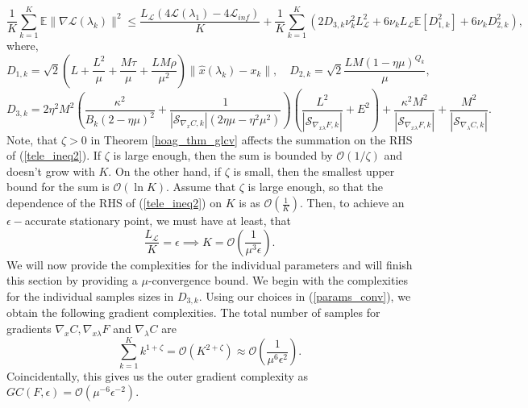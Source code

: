 \documentclass[11pt, twoside]{report}
\begin{document}
\begin{equation} \label{tele_ineq2}
    \frac{1}{K}\sum_{k=1}^K \mathbb{E}\|\nabla\mathcal{L}(\lambda_k)\|^2 \leq  \frac{L_\mathcal{L}\left(4\mathcal{L}(\lambda_1) - 4\mathcal{L}_{inf}\right)}{K} + \frac{1}{K}\sum_{k=1}^K \left(2D_{3,k}\nu_k^2 L^2_{\mathcal{L}} + 6\nu_kL_\mathcal{L}\mathbb{E}[D_{1,k}^2] + 6\nu_k D_{2,k}^2\right),
\end{equation}
where,
\[D_{1,k} = \sqrt{2}\left(L + \frac{L^2}{\mu} + \frac{M\tau}{\mu} + \frac{LM\rho}{\mu^2} \right) \|\hat{x}(\lambda_k) - x_k\|, \quad D_{2,k} = \sqrt{2} \frac{LM(1-\eta \mu)^{Q_k}}{\mu},\]
\begin{equation} \label{varbndthm2}
    D_{3,k} = 2\eta^2M^2\left(\frac{\kappa^2}{B_k (2 - \eta \mu)^2} + \frac{1}{|\mathcal{S}_{\nabla_{x} C,k}|(2\eta \mu - \eta^2 \mu^2)} \right)\left(\frac{L^2}{|\mathcal{S}_{\nabla_{x\lambda} F,k}|} + E^2\right)  +  \frac{\kappa^2M^2}{|\mathcal{S}_{\nabla_{x\lambda} F,k}|}+ \frac{M^2}{|\mathcal{S}_{\nabla_{\lambda} C,k}|}.
\end{equation}
Note, that $\zeta>0$ in Theorem \ref{hoag_thm_glcv} affects the summation on the RHS of (\ref{tele_ineq2}). If $\zeta$ is large enough, then the sum is bounded by $\mathcal{O}(1/\zeta)$ and doesn't grow with $K$. On the other hand, if $\zeta$ is small, then the smallest upper bound for the sum is $\mathcal{O}(\ln{K})$. Assume that $\zeta$ is large enough, so that the dependence of the RHS of (\ref{tele_ineq2}) on $K$ is as $\mathcal{O}\left( \frac{1}{K} \right)$. Then, to achieve an $\epsilon-$accurate stationary point, we must have at least, that
\[\frac{L_\mathcal{L}}{K} = \epsilon \implies K = \mathcal{O}\left(\frac{1}{\mu^3 \epsilon} \right).\]
We will now provide the complexities for the individual parameters and will finish this section by providing a $\mu$-convergence bound. We begin with the complexities for the individual samples sizes in $D_{3,k}$. Using our choices in (\ref{params_conv}), we obtain the following gradient complexities. The total number of samples for gradients $\nabla_{x}C, \nabla_{x\lambda} F$ and $\nabla_\lambda C$ are
\[\sum_{k=1}^K k^{1+\zeta} = \mathcal{O} \left(K^{2+\zeta} \right) \approx \mathcal{O}\left(\frac{1}{\mu^6\epsilon^2}\right).\]
Coincidentally, this gives us the outer gradient complexity as $GC(F,\epsilon) = \mathcal{O}(\mu^{-6}\epsilon^{-2})$.
\end{document}
